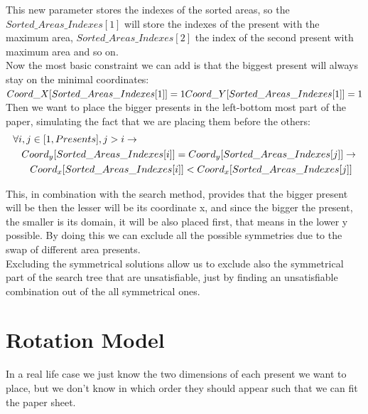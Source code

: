 This new parameter stores the indexes of the sorted areas, so the $Sorted\_Areas\_Indexes[1]$ will store the indexes of the present with
the maximum area, $Sorted\_Areas\_Indexes[2]$ the index of the second present with maximum area and so on.\\
\newpage
Now the most basic constraint we can add is that the biggest present will always stay on the minimal coordinates:\\
$
Coord\_X[Sorted\_Areas\_Indexes[1]] = 1\\
Coord\_Y[Sorted\_Areas\_Indexes[1]] = 1
$
\\

Then we want to place the bigger presents in the left-bottom most part of the paper, simulating the fact that we are placing them before
the others:
\begin{equation*}\begin{split}
    &\forall i, j \in [1, Presents], j > i \rightarrow\\
    &\eqindent Coord_y[Sorted\_Areas\_Indexes[i]] = Coord_y[Sorted\_Areas\_Indexes[j]] \rightarrow \\
    &\eqindent \eqindent Coord_x[Sorted\_Areas\_Indexes[i]] < Coord_x[Sorted\_Areas\_Indexes[j]]
\end{split}\end{equation*}

This, in combination with the search method, provides that the bigger present will be then the lesser will be its coordinate x,
and since the bigger the present, the smaller is its domain, it will be also placed first, that means in the lower y possible.
By doing this we can exclude all the possible symmetries due to the swap of different area presents.\\
Excluding the symmetrical solutions allow us to exclude also the symmetrical part of the search tree that are unsatisfiable, just
by finding an unsatisfiable combination out of the all symmetrical ones.



\newpage
\section{Rotation Model}
In a real life case we just know the two dimensions of each present we want to place, but we don't know in which order they should appear such that we can fit the paper sheet.

